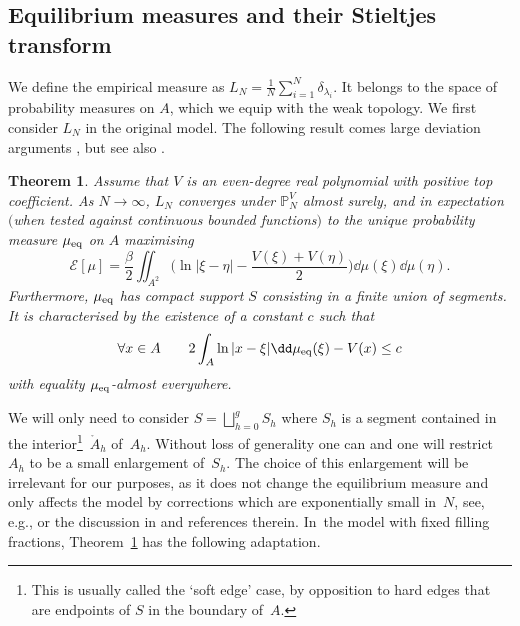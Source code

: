 \documentclass[pdftex]{sigma}
\numberwithin{equation}{section}
\newtheorem{Theorem}{Theorem}[section]
\begin{document}
\subsection{Equilibrium measures and their Stieltjes transform}
\label{eqmessec}
We define the empirical measure as $L_N = \frac{1}{N}\sum_{i=1}^{N}\delta_{\lambda_{i}}$. It belongs to the space of probability measures on $A$, which we equip with the weak topology. We first consider $L_N$ in the original model. The following result comes large deviation arguments \cite[Theorem~2.6.1 and Corollary~2.6.3]{BookAG}, but see also \cite{APS01,Deift,Johan}.
\begin{Theorem}\label{thm:equilibrium}
 Assume that $V$ is an even-degree real polynomial with positive top coefficient. As $N \rightarrow \infty$, $L_{N}$
 converges under $\mathbb{P}_{N}^{V}$ almost surely, and in
 expectation $($when tested against continuous bounded functions$)$ to the unique probability measure
 $\mu_{{\rm eq}}$ on $A$ maximising
 \begin{equation}\label{energy}
 \mathcal{E}[\mu] = \frac{\beta}{2}\iint_{A^2} \biggl( \ln|\xi - \eta| -\frac{V(\xi) + V(\eta)}{2}\biggr)\dd\mu(\xi)\dd\mu(\eta).
 \end{equation}
 Furthermore, $\mu_{{\rm eq}}$ has compact
 support $S$ consisting in a finite union of segments. It is characterised by the existence of a constant $c$ such
 that
 \begin{equation}\label{eq:charc-eq}
	\forall x \in A \qquad 2\int_{A}\ln|x - \xi|\dd\mu_{{\rm eq}}(\xi) - V(x) \leq c
 \end{equation}
 with equality $\mu_{{\rm eq}}$-almost everywhere.
\end{Theorem}

We will only need to consider $S = \bigsqcup_{h = 0}^{g} S_h$ where $S_h$ is a segment contained in the interior\footnote{This is usually called the `soft edge' case, by opposition to hard edges that are endpoints of $S$ in the boundary of~$A$.}~$\mathring{A}_h$ of~$A_h$.
 Without loss of generality one can and one will restrict $A_h$ to be a small enlargement of~$S_h$. The choice of this enlargement will be irrelevant for our purposes, as it does not change the equilibrium measure and only affects the model by corrections which are exponentially small in~$N$, see, e.g., \cite[Proposition~2]{APS01} or the discussion in \cite[Section~2]{BG11} and references therein. In~the model with fixed filling fractions, Theorem~\ref{thm:equilibrium} has the following adaptation.
\end{document}
